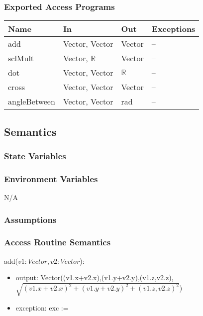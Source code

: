 \documentclass[12pt, titlepage]{article}
\begin{document}
\subsubsection{Exported Access Programs}
\begin{center}
	\begin{tabular}{p{3cm} p{4cm} p{2cm} p{4cm}}
		\hline
		\textbf{Name} & \textbf{In} & \textbf{Out} & \textbf{Exceptions} \\
		\hline
		add & Vector, Vector & Vector & -- \\
		sclMult & Vector, $\mathbb{R}$ & Vector & -- \\ 
		dot & Vector, Vector & $\mathbb{R}$ & -- \\
		cross & Vector, Vector & Vector & -- \\
		angleBetween & Vector, Vector & rad & -- \\
		\hline
	\end{tabular}
\end{center}

\subsection{Semantics}
\subsubsection{State Variables}

\subsubsection{Environment Variables}
N/A

\subsubsection{Assumptions}

\subsubsection{Access Routine Semantics}
\noindent add($v1:Vector, v2:Vector$):
\begin{itemize}
	\item output: 
	Vector((v1.x+v2.x),(v1.y+v2.y),(v1.z,v2.z), \\
	$\sqrt{(v1.x+v2.x)^2+(v1.y+v2.y)^2+(v1.z,v2.z)^2}$)
	\item exception: exc := \\
\end{itemize}
\end{document}
